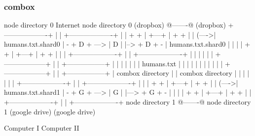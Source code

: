 \begin{frame}[fragile]
  \frametitle{combox}

  {\tiny
  \begin{semiverbatim}

         node directory 0                Internet              node directory 0
         (dropbox)                       @-------@             (dropbox)
        +-------------------+            |       |            +-------------------+
        |                   |    + +     | +---+ |     + +    |                   |
  (---->| humans.txt.shard0 | - + D + ---> | D | |--> + D + - | humans.txt.shard0 |
  |     |                   |    + +     | +---+ |     + +    |                   |
  |     +-------------------+            |       |            +-------------------+
  |                                      |       |
  |                                      |       |
 +------------------+                    |       |                        +-----------------+
 |                  |                    |       |                        |                 |
 |  humans.txt      |                    |       |                        |                 |
 |                  |                    |       |                        |                 |
 +------------------+                    |       |                        +-----------------+
  |  combox directory                    |       |                      combox directory
  |                                      |       |
  |                                      |       |
  |     +-------------------+            |       |             +-------------------+
  |     |                   |    + +     | +---+ |      + +    |                   |
  (---->| humans.txt.shard1 | - + G + ---> | G | |---> + G + - |                   |
        |                   |    + +     | +---+ |      + +    |                   |
        +-------------------+            |       |             +-------------------+
         node directory 1                @-------@              node directory 1
         (google drive)                                         (google drive)

  Computer I                                                                    Computer II
  \end{semiverbatim}
  }

\end{frame}

